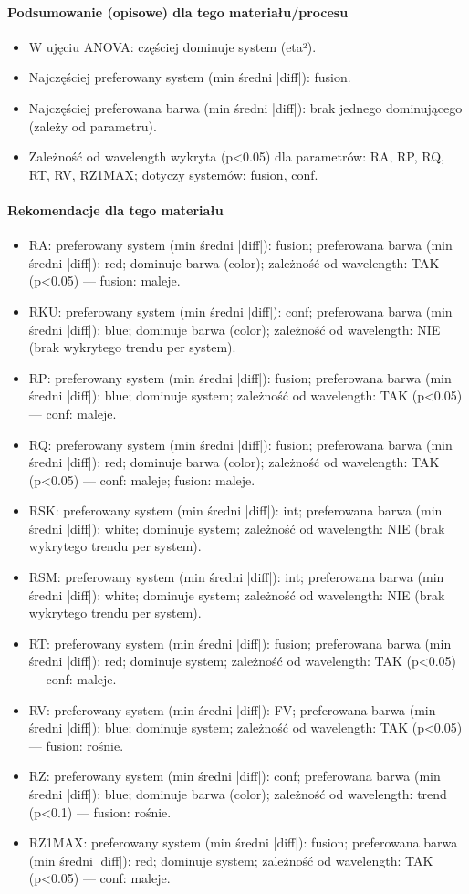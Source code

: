 \documentclass[
  10pt,
]{article}
\begin{document}
\paragraph{Podsumowanie (opisowe) dla tego materiału/procesu}
\begin{itemize}
\item W ujęciu ANOVA: częściej dominuje system (eta²).
\item Najczęściej preferowany system (min średni |diff|): fusion.
\item Najczęściej preferowana barwa (min średni |diff|): brak jednego dominującego (zależy od parametru).
\item Zależność od wavelength wykryta (p<0.05) dla parametrów: RA, RP, RQ, RT, RV, RZ1MAX; dotyczy systemów: fusion, conf.
\end{itemize}
\paragraph{Rekomendacje dla tego materiału}
\begin{itemize}
\item RA: preferowany system (min średni |diff|): fusion; preferowana barwa (min średni |diff|): red; dominuje barwa (color); zależność od wavelength: TAK (p<0.05) — fusion: maleje.
\item RKU: preferowany system (min średni |diff|): conf; preferowana barwa (min średni |diff|): blue; dominuje barwa (color); zależność od wavelength: NIE (brak wykrytego trendu per system).
\item RP: preferowany system (min średni |diff|): fusion; preferowana barwa (min średni |diff|): blue; dominuje system; zależność od wavelength: TAK (p<0.05) — conf: maleje.
\item RQ: preferowany system (min średni |diff|): fusion; preferowana barwa (min średni |diff|): red; dominuje barwa (color); zależność od wavelength: TAK (p<0.05) — conf: maleje; fusion: maleje.
\item RSK: preferowany system (min średni |diff|): int; preferowana barwa (min średni |diff|): white; dominuje system; zależność od wavelength: NIE (brak wykrytego trendu per system).
\item RSM: preferowany system (min średni |diff|): int; preferowana barwa (min średni |diff|): white; dominuje system; zależność od wavelength: NIE (brak wykrytego trendu per system).
\item RT: preferowany system (min średni |diff|): fusion; preferowana barwa (min średni |diff|): red; dominuje system; zależność od wavelength: TAK (p<0.05) — conf: maleje.
\item RV: preferowany system (min średni |diff|): FV; preferowana barwa (min średni |diff|): blue; dominuje system; zależność od wavelength: TAK (p<0.05) — fusion: rośnie.
\item RZ: preferowany system (min średni |diff|): conf; preferowana barwa (min średni |diff|): blue; dominuje barwa (color); zależność od wavelength: trend (p<0.1) — fusion: rośnie.
\item RZ1MAX: preferowany system (min średni |diff|): fusion; preferowana barwa (min średni |diff|): red; dominuje system; zależność od wavelength: TAK (p<0.05) — conf: maleje.
\end{itemize}
\end{document}
